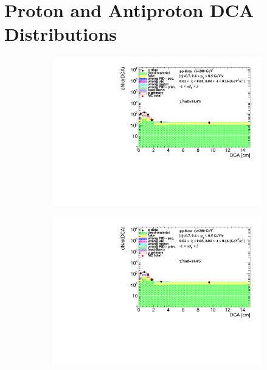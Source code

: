 \chapter[Proton and Antiproton DCA Distributions]{Proton and Antiproton DCA Distributions}\label{appendix:DCA_proton}
\begin{figure}[h!]
	\centering
	\begin{subfigure}{.45\textwidth}
		\includegraphics[width=\linewidth, page=1]{chapters/chrgSTAR/img/DCAproton/background_p_0.pdf}
	\end{subfigure}
	\begin{subfigure}{.45\textwidth}
		\includegraphics[width=\linewidth, page=2]{chapters/chrgSTAR/img/DCAproton/background_p_0.pdf}
	\end{subfigure}
	\begin{subfigure}{.45\textwidth}

\end{subfigure}
\end{figure}
